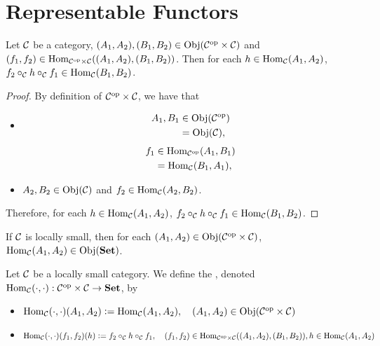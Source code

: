 \documentclass{book}
\begin{document}
\section{Representable Functors}

\begin{ex} 
	Let $\mathcal{C}$ be a category, $(A_1, A_2), (B_1, B_2) \in \operatorname{Obj}({\mathcal{C}}^{\text{op}} \times \mathcal{C})$ and $(f_1, f_2) \in \operatorname{Hom}_{{\mathcal{C}}^{\text{op}} \times \mathcal{C}}((A_1, A_2), (B_1, B_2))$. Then for each $h \in \operatorname{Hom}_{\mathcal{C}}(A_1, A_2)$, $f_2 \circ_{\mathcal{C}} h \circ_{\mathcal{C}} f_1 \in \operatorname{Hom}_{\mathcal{C}}(B_1, B_2)$. 
\end{ex}

\begin{proof}
	By definition of ${\mathcal{C}}^{\text{op}} \times \mathcal{C}$, we have that
	\begin{itemize}
		\item 
		\begin{align*}
			A_1, B_1
			& \in \operatorname{Obj}({\mathcal{C}}^{\text{op}}) \\
			& = \operatorname{Obj}(\mathcal{C}),
		\end{align*}
		\begin{align*}
			f_1 
			& \in \operatorname{Hom}_{{\mathcal{C}}^{\text{op}}}(A_1, B_1) \\
			& = \operatorname{Hom}_{\mathcal{C}}(B_1, A_1),
		\end{align*}
		\item $A_2, B_2 \in \operatorname{Obj}(\mathcal{C})$ and $f_2 \in \operatorname{Hom}_{\mathcal{C}}(A_2, B_2)$.
	\end{itemize}
	Therefore, for each $h \in \operatorname{Hom}_{\mathcal{C}}(A_1, A_2)$, $f_2 \circ_{\mathcal{C}} h \circ_{\mathcal{C}} f_1 \in \operatorname{Hom}_{\mathcal{C}}(B_1, B_2)$.
\end{proof}

\begin{note}
	If $\mathcal{C}$ is locally small, then for each $(A_1, A_2) \in \operatorname{Obj}({\mathcal{C}}^{\text{op}} \times \mathcal{C})$, $\operatorname{Hom}_{\mathcal{C}}(A_1, A_2) \in \operatorname{Obj}(\text{\textbf{Set}})$.
\end{note}

\begin{defn} 
	Let $\mathcal{C}$ be a locally small category. We define the , denoted $\operatorname{Hom}_{\mathcal{C}}(\cdot, \cdot):{\mathcal{C}}^{\text{op}} \times \mathcal{C} \rightarrow \text{\textbf{Set}}$, by 
	\begin{itemize}
		\item $\operatorname{Hom}_{\mathcal{C}}(\cdot, \cdot)(A_1, A_2) \vcentcolon= \operatorname{Hom}_{\mathcal{C}}(A_1, A_2), \quad (A_1, A_2) \in \operatorname{Obj}({\mathcal{C}}^{\text{op}} \times \mathcal{C})$
		\item $\operatorname{Hom}_{\mathcal{C}}(\cdot, \cdot)(f_1,f_2)(h) \vcentcolon= f_2 \circ_{\mathcal{C}} h \circ_{\mathcal{C}} f_1, \quad (f_1, f_2) \in \operatorname{Hom}_{{\mathcal{C}}^{\text{op}} \times \mathcal{C}}((A_1, A_2), (B_1, B_2)), h \in \operatorname{Hom}_{\mathcal{C}}(A_1, A_2)$
	\end{itemize}
\end{defn}
\end{document}
